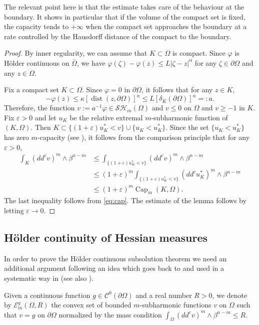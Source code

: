 \documentclass[JEP,XML,SOM,Unicode]{cedram}
\DeclareMathOperator{\dist}{dist}
\theoremstyle{definition}
\newcommand{\Cc}{\mathcal{C}}
\DeclareMathOperator{\Capa}{Cap}
\begin{document}
The relevant point here is that the estimate takes care of the behaviour at the boundary. It shows in particular that if the volume of the compact set is fixed, the capacity tends to $+ \infty$ when the compact set approaches the boundary at a rate controlled by the Hausdorff distance of the compact to the boundary.
\begin{proof}
By inner regularity, we can assume that $K \subset \Omega$ is compact.
Since $\varphi$ is Hölder continuous on $\bar \Omega$, we have
$\varphi (\zeta) - \varphi (z) \leq L \vert \zeta - z\vert^{\alpha}$ for any $\zeta \in \partial \Omega$ and any $z \in \Omega$.

Fix a compact set $K \subset \Omega$. Since $\varphi = 0$ in $\partial \Omega$, it follows that for any $z \in K$,
\[
- \varphi (z) \leq \kappa \left[\dist (z,\partial \Omega)\right]^{\alpha} \leq L \left[\delta_K (\partial \Omega)\right]^{\alpha} =:a.
\]
Therefore, the function $v:= a^{-1} \varphi \in \mathcal{SH}_m (\Omega)$ and $ v \leq 0$ on $\Omega$ and $v \geq - 1$ in $K$. Fix $\varepsilon >0$ and let $u_K$ be the relative extremal $m$-subharmonic function of $(K,\Omega)$. Then $ K \subset \{ (1 + \varepsilon) u_K^* < v\} \cup \{u_K < u_K^*\}$. Since the set $\{u_K < u_K^*\}$ has zero $m$-capacity (see \cite{Lu12}), it follows from the comparison principle that for any $\varepsilon > 0$,
\begin{align*}
\int_K (dd^c v)^m \wedge \beta^{n - m} &\leq \int_{\{ (1 + \varepsilon) u_K^* < v\}} (dd^c v)^m \wedge \beta^{n - m} \\
&\leq (1+ \varepsilon)^m \int_{\{ (1 + \varepsilon) u_K^* < v\}} (dd^c u_K^*)^m \wedge \beta^{n - m} \\
& \leq (1+ \varepsilon)^m \Capa_m (K,\Omega).
\end{align*}
The last inequality follows from \eqref{eq:cap}.
The estimate of the lemma follows by letting $\varepsilon \to 0$.
\end{proof}

\subsection{Hölder continuity of Hessian measures}

In order to prove the Hölder continuous subsolution theorem we need an additional argument following an idea which goes back to \cite{DDGKPZ15} and used in a systematic way in \cite{N18a} (see also \cite{KN19}).

Given a continuous function $g \in \Cc^0 (\partial \Omega)$ and a real number $R > 0$, we denote by $\mathcal{E}^g_m(\Omega,R)$ the convex set of bounded $m$-subharmonic functions $v $ on $\Omega$ such that $v = g$ on $\partial \Omega$ normalized by the mass condition $\int_{\Omega} (dd^c v)^m \wedge \beta^{n -m} \leq R$.
\end{document}
